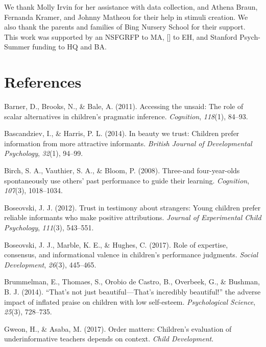 \documentclass[10pt, letterpaper]{article}
\begin{document}
We thank Molly Irvin for her assistance with data collection, and Athena
Braun, Fernanda Kramer, and Johnny Matheou for their help in stimuli
creation. We also thank the parents and families of Bing Nursery School
for their support. This work was supported by an NSFGRFP to MA, {[}{]}
to EH, and Stanford Psych-Summer funding to HQ and BA.

\section{References}\label{references}

\setlength{\parindent}{-0.1in} \setlength{\leftskip}{0.125in} \noindent

\hypertarget{refs}{}
\hypertarget{ref-barner2011accessing}{}
Barner, D., Brooks, N., \& Bale, A. (2011). Accessing the unsaid: The
role of scalar alternatives in children's pragmatic inference.
\emph{Cognition}, \emph{118}(1), 84--93.

\hypertarget{ref-bascandziev2014beauty}{}
Bascandziev, I., \& Harris, P. L. (2014). In beauty we trust: Children
prefer information from more attractive informants. \emph{British
Journal of Developmental Psychology}, \emph{32}(1), 94--99.

\hypertarget{ref-birch2008three}{}
Birch, S. A., Vauthier, S. A., \& Bloom, P. (2008). Three-and
four-year-olds spontaneously use others' past performance to guide their
learning. \emph{Cognition}, \emph{107}(3), 1018--1034.

\hypertarget{ref-boseovski2012trust}{}
Boseovski, J. J. (2012). Trust in testimony about strangers: Young
children prefer reliable informants who make positive attributions.
\emph{Journal of Experimental Child Psychology}, \emph{111}(3),
543--551.

\hypertarget{ref-boseovski2017role}{}
Boseovski, J. J., Marble, K. E., \& Hughes, C. (2017). Role of
expertise, consensus, and informational valence in children's
performance judgments. \emph{Social Development}, \emph{26}(3),
445--465.

\hypertarget{ref-brummelman2014s}{}
Brummelman, E., Thomaes, S., Orobio de Castro, B., Overbeek, G., \&
Bushman, B. J. (2014). ``That's not just beautiful---That's incredibly
beautiful!'' the adverse impact of inflated praise on children with low
self-esteem. \emph{Psychological Science}, \emph{25}(3), 728--735.

\hypertarget{ref-gweon2017order}{}
Gweon, H., \& Asaba, M. (2017). Order matters: Children's evaluation of
underinformative teachers depends on context. \emph{Child Development}.
\end{document}
